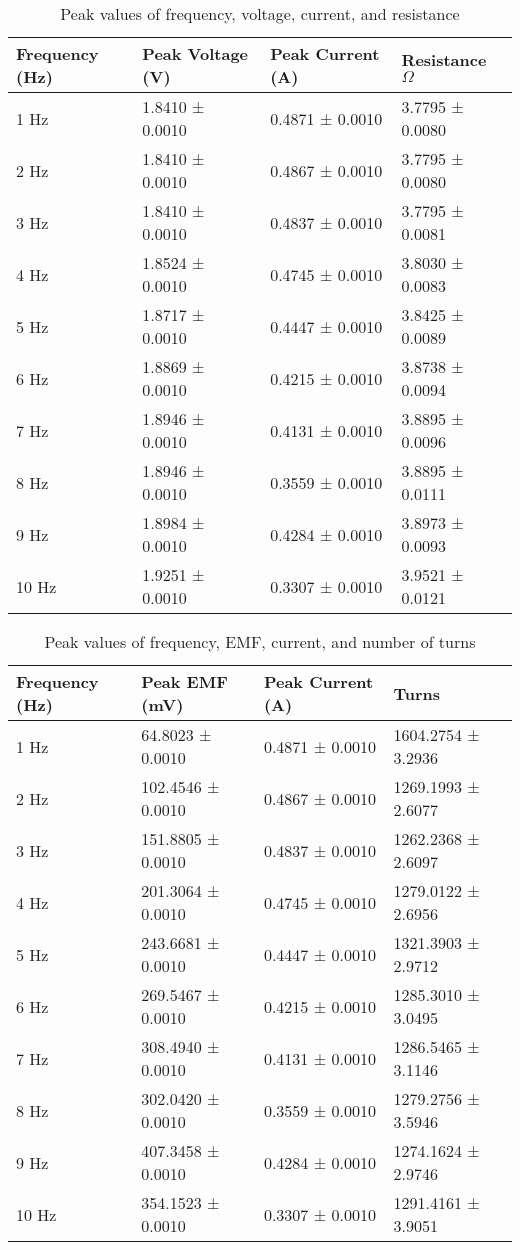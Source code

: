 
\begin{table}[]
\centering
\begin{tabular}{|l|l|l|l|}
\hline
Frequency (Hz) & Peak Voltage (V) & Peak Current (A) & Resistance $\Omega$ \\ \hline
1 Hz & 1.8410 ± 0.0010 & 0.4871 ± 0.0010 & 3.7795 ± 0.0080 \\ \hline
2 Hz & 1.8410 ± 0.0010 & 0.4867 ± 0.0010 & 3.7795 ± 0.0080 \\ \hline
3 Hz & 1.8410 ± 0.0010 & 0.4837 ± 0.0010 & 3.7795 ± 0.0081 \\ \hline
4 Hz & 1.8524 ± 0.0010 & 0.4745 ± 0.0010 & 3.8030 ± 0.0083 \\ \hline
5 Hz & 1.8717 ± 0.0010 & 0.4447 ± 0.0010 & 3.8425 ± 0.0089 \\ \hline
6 Hz & 1.8869 ± 0.0010 & 0.4215 ± 0.0010 & 3.8738 ± 0.0094 \\ \hline
7 Hz & 1.8946 ± 0.0010 & 0.4131 ± 0.0010 & 3.8895 ± 0.0096 \\ \hline
8 Hz & 1.8946 ± 0.0010 & 0.3559 ± 0.0010 & 3.8895 ± 0.0111 \\ \hline
9 Hz & 1.8984 ± 0.0010 & 0.4284 ± 0.0010 & 3.8973 ± 0.0093 \\ \hline
10 Hz & 1.9251 ± 0.0010 & 0.3307 ± 0.0010 & 3.9521 ± 0.0121 \\ \hline
\end{tabular}
\caption{Peak values of frequency, voltage, current, and resistance}
\label{tab:peak_values1}
\end{table}

\begin{table}[]
\centering
\begin{tabular}{|l|l|l|l|}
\hline
Frequency (Hz) & Peak EMF (mV) & Peak Current (A) & Turns \\ \hline
1 Hz & 64.8023 ± 0.0010 & 0.4871 ± 0.0010 & 1604.2754 ± 3.2936 \\ \hline
2 Hz & 102.4546 ± 0.0010 & 0.4867 ± 0.0010 & 1269.1993 ± 2.6077 \\ \hline
3 Hz & 151.8805 ± 0.0010 & 0.4837 ± 0.0010 & 1262.2368 ± 2.6097 \\ \hline
4 Hz & 201.3064 ± 0.0010 & 0.4745 ± 0.0010 & 1279.0122 ± 2.6956 \\ \hline
5 Hz & 243.6681 ± 0.0010 & 0.4447 ± 0.0010 & 1321.3903 ± 2.9712 \\ \hline
6 Hz & 269.5467 ± 0.0010 & 0.4215 ± 0.0010 & 1285.3010 ± 3.0495 \\ \hline
7 Hz & 308.4940 ± 0.0010 & 0.4131 ± 0.0010 & 1286.5465 ± 3.1146 \\ \hline
8 Hz & 302.0420 ± 0.0010 & 0.3559 ± 0.0010 & 1279.2756 ± 3.5946 \\ \hline
9 Hz & 407.3458 ± 0.0010 & 0.4284 ± 0.0010 & 1274.1624 ± 2.9746 \\ \hline
10 Hz & 354.1523 ± 0.0010 & 0.3307 ± 0.0010 & 1291.4161 ± 3.9051 \\ \hline
\end{tabular}
\caption{Peak values of frequency, EMF, current, and number of turns}
\label{tab:peak_values2}
\end{table}
